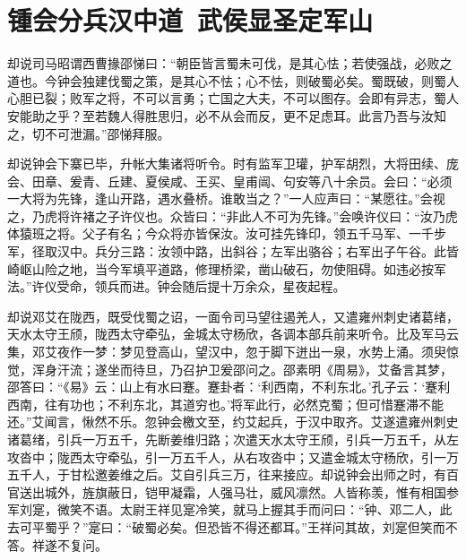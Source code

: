 \chapter{锺会分兵汉中道~武侯显圣定军山}

却说司马昭谓西曹掾邵悌曰：“朝臣皆言蜀未可伐，是其心怯；若使强战，必败之道也。今钟会独建伐蜀之策，是其心不怯；心不怯，则破蜀必矣。蜀既破，则蜀人心胆已裂；败军之将，不可以言勇；亡国之大夫，不可以图存。会即有异志，蜀人安能助之乎？至若魏人得胜思归，必不从会而反，更不足虑耳。此言乃吾与汝知之，切不可泄漏。”邵悌拜服。

却说钟会下寨已毕，升帐大集诸将听令。时有监军卫瓘，护军胡烈，大将田续、庞会、田章、爰青、丘建、夏侯咸、王买、皇甫闿、句安等八十余员。会曰：“必须一大将为先锋，逢山开路，遇水叠桥。谁敢当之？”一人应声曰：“某愿往。”会视之，乃虎将许褚之子许仪也。众皆曰：“非此人不可为先锋。”会唤许仪曰：“汝乃虎体猿班之将。父子有名；今众将亦皆保汝。汝可挂先锋印，领五千马军、一千步军，径取汉中。兵分三路：汝领中路，出斜谷；左军出骆谷；右军出子午谷。此皆崎岖山险之地，当今军填平道路，修理桥梁，凿山破石，勿使阻碍。如违必按军法。”许仪受命，领兵而进。钟会随后提十万余众，星夜起程。

却说邓艾在陇西，既受伐蜀之诏，一面令司马望往遏羌人，又遣雍州刺史诸葛绪，天水太守王颀，陇西太守牵弘，金城太守杨欣，各调本部兵前来听令。比及军马云集，邓艾夜作一梦：梦见登高山，望汉中，忽于脚下迸出一泉，水势上涌。须臾惊觉，浑身汗流；遂坐而待旦，乃召护卫爰邵问之。邵素明《周易》，艾备言其梦，邵答曰：“《易》云：山上有水曰蹇。蹇卦者：‘利西南，不利东北。’孔子云：‘蹇利西南，往有功也；不利东北，其道穷也。’将军此行，必然克蜀；但可惜蹇滞不能还。”艾闻言，愀然不乐。忽钟会檄文至，约艾起兵，于汉中取齐。艾遂遣雍州刺史诸葛绪，引兵一万五千，先断姜维归路；次遣天水太守王颀，引兵一万五千，从左攻沓中；陇西太守牵弘，引一万五千人，从右攻沓中；又遣金城太守杨欣，引一万五千人，于甘松邀姜维之后。艾自引兵三万，往来接应。却说钟会出师之时，有百官送出城外，旌旗蔽日，铠甲凝霜，人强马壮，威风凛然。人皆称羡，惟有相国参军刘寔，微笑不语。太尉王祥见寔冷笑，就马上握其手而问曰：“钟、邓二人，此去可平蜀乎？”寔曰：“破蜀必矣。但恐皆不得还都耳。”王祥问其故，刘寔但笑而不答。祥遂不复问。

